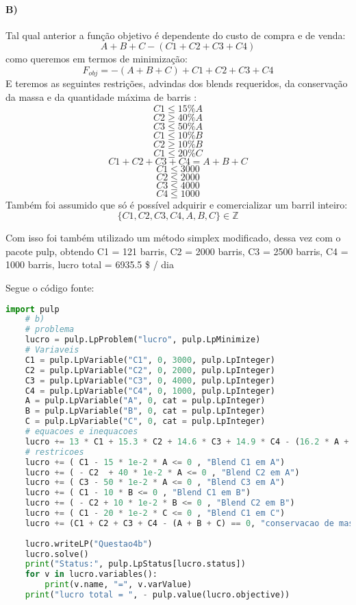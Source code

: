 \documentclass[]{article} %
\begin{document}
\paragraph{B)}
Tal qual anterior a função objetivo é dependente do custo de compra e de venda:
\[ A + B + C - (C1 + C2 + C3 + C4) \]
como queremos em termos de minimização:
\[ F_{obj} = - ( A + B + C ) + C1 + C2 + C3 + C4 \]
E teremos as seguintes restrições, advindas dos blends requeridos, da conservação da massa e da quantidade máxima de barris :
\[ C1 \leqslant  15 \% A \]
\[ C2 \geqslant 40\% A \]
\[ C3 \leqslant  50 \% A \]
\[ C1 \leqslant 10\% B \]
\[ C2 \geqslant 10\% B \]
\[ C1 \leqslant 20\% C \]
\[ C1 + C2 + C3 + C4 = A + B + C \]
\[ C1 \leqslant 3000 \]
\[ C2 \leqslant 2000 \]
\[ C3 \leqslant 4000 \]
\[ C4 \leqslant 1000 \]
Também foi assumido que só é possível adquirir e comercializar um barril inteiro:
\[ \{C1, C2, C3, C4, A, B, C\} \in \mathbb{Z} \]

Com isso foi também utilizado um método simplex modificado, dessa vez com o pacote pulp, obtendo
C1 = 121 barris,
C2 = 2000 barris,
C3 = 2500 barris,
C4 = 1000 barris, lucro total =  6935.5 \$ / dia

Segue o código fonte:
\begin{lstlisting}[language=Python]
    import pulp
    # b)
    # problema
    lucro = pulp.LpProblem("lucro", pulp.LpMinimize)
    # Variaveis
    C1 = pulp.LpVariable("C1", 0, 3000, pulp.LpInteger)
    C2 = pulp.LpVariable("C2", 0, 2000, pulp.LpInteger)
    C3 = pulp.LpVariable("C3", 0, 4000, pulp.LpInteger)
    C4 = pulp.LpVariable("C4", 0, 1000, pulp.LpInteger)
    A = pulp.LpVariable("A", 0, cat = pulp.LpInteger)
    B = pulp.LpVariable("B", 0, cat = pulp.LpInteger)
    C = pulp.LpVariable("C", 0, cat = pulp.LpInteger)
    # equacoes e inequacoes
    lucro += 13 * C1 + 15.3 * C2 + 14.6 * C3 + 14.9 * C4 - (16.2 * A + 15.75 * B + 15.3 * C), "lucro total" # funcao objetivo
    # restricoes
    lucro += ( C1 - 15 * 1e-2 * A <= 0 , "Blend C1 em A")
    lucro += ( - C2  + 40 * 1e-2 * A <= 0 , "Blend C2 em A")
    lucro += ( C3 - 50 * 1e-2 * A <= 0 , "Blend C3 em A")
    lucro += ( C1 - 10 * B <= 0 , "Blend C1 em B")
    lucro += ( - C2 + 10 * 1e-2 * B <= 0 , "Blend C2 em B")
    lucro += ( C1 - 20 * 1e-2 * C <= 0 , "Blend C1 em C")
    lucro += (C1 + C2 + C3 + C4 - (A + B + C) == 0, "conservacao de massa")
    
    lucro.writeLP("Questao4b")
    lucro.solve()
    print("Status:", pulp.LpStatus[lucro.status])
    for v in lucro.variables():
        print(v.name, "=", v.varValue)
    print("lucro total = ", - pulp.value(lucro.objective))
\end{lstlisting}
\end{document}
